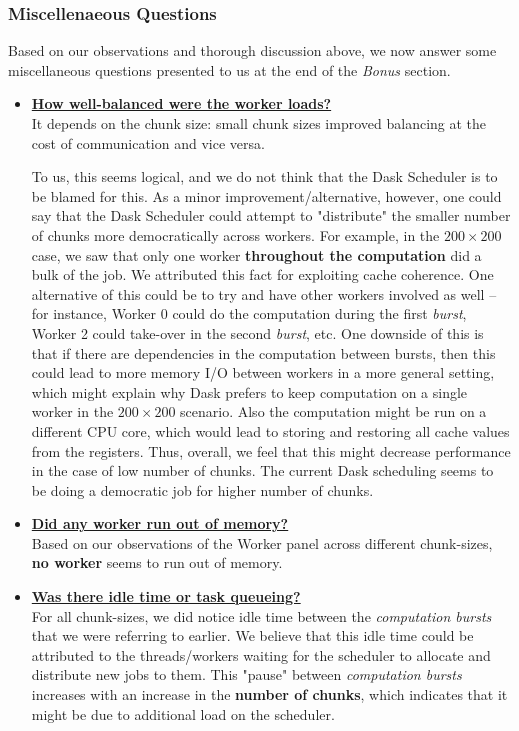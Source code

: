 \documentclass[a4paper,12pt]{article}
\begin{document}
\subsubsection{Miscellenaeous Questions}
Based on our observations and thorough discussion above, we now answer some miscellaneous questions presented to us at the end of the \textit{Bonus} section.

\begin{itemize}
\item \textbf{\underline{How well-balanced were the worker loads?}}\\
  It depends on the chunk size: small chunk sizes improved balancing at the cost of communication and vice versa.

  To us, this seems logical, and we do not think that the Dask Scheduler is to be blamed for this. As a minor improvement/alternative, however, one could say that the Dask Scheduler could attempt to "distribute" the smaller number of chunks more democratically across workers. For example, in the $200 \times 200$ case, we saw that only one worker \textbf{throughout the computation} did a bulk of the job.
  We attributed this fact for exploiting cache coherence.
  One alternative of this could be to try and have other workers involved as well -- for instance, Worker 0 could do the computation during the first \textit{burst}, Worker 2 could take-over in the second \textit{burst}, etc.
  One downside of this is that if there are dependencies in the computation between bursts, then this could lead to more memory I/O between workers in a more general setting, which might explain why Dask prefers to keep computation on a single worker in the $200 \times 200$ scenario.
  Also the computation might be run on a different CPU core, which would lead to storing and restoring all cache values from the registers.
  Thus, overall, we feel that this might decrease performance in the case of low number of chunks.
  The current Dask scheduling seems to be doing a democratic job for higher number of chunks.

\item \textbf{\underline{Did any worker run out of memory?}}\\
  Based on our observations of the Worker panel across different chunk-sizes, \textbf{no worker} seems to run out of memory.

\item \textbf{\underline{Was there idle time or task queueing?}}\\
  For all chunk-sizes, we did notice idle time between the \textit{computation bursts} that we were referring to earlier.
  We believe that this idle time could be attributed to the threads/workers waiting for the scheduler to allocate and distribute new jobs to them.
  This "pause" between \textit{computation bursts} increases with an increase in the \textbf{number of chunks}, which indicates that it might be due to additional load on the scheduler.


\end{itemize}
\end{document}
